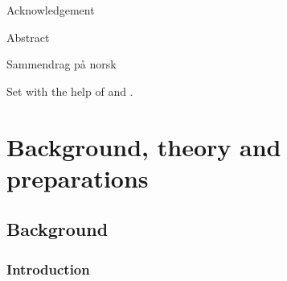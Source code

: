 \documentclass[11pt,bibliography=totoc,index=totoc]{scrbook}   %
\begin{document}
\frontmatter


Acknowledgement

Abstract

Sammendrag på norsk



Set with the help of {\LaTeXe} and {\KOMAScript}.


\tableofcontents

\mainmatter
\pagestyle{scrheadings}

\part{Background, theory and preparations}

%
\chapter{Background}\label{cha:Background} %
%

%
\section{Introduction}\label{sec:Intro}
%



\end{document}

